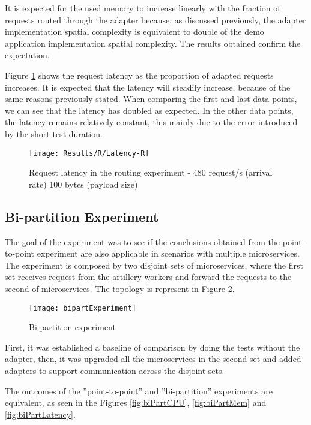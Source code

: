 It is expected for the used memory to increase linearly with the fraction of requests routed through the adapter because, as discussed previously,
the adapter implementation spatial complexity is equivalent to double of the demo application implementation spatial complexity.
The results obtained confirm the expectation.

Figure \ref{fig:routLatency} shows the request latency as the proportion of adapted requests increases.
It is expected that the latency will steadily increase, because of the same reasons previously stated.
When comparing the first and last data points, we can see that the latency has doubled as expected.
In the other data points, the latency remains relatively constant, this mainly due to the error introduced by the short test duration.

\begin{figure}[htbp]
    \centering
    \centerline{\texttt{[image: Results/R/Latency-R]}}
    \caption{Request latency in the routing experiment - 480 request/s (arrival rate) 100 bytes (payload size)}
    \label{fig:routLatency}
\end{figure}

\subsection{Bi-partition Experiment}

The goal of the experiment was to see if the conclusions obtained from the point-to-point experiment are also applicable in scenarios with multiple microservices.
The experiment is composed by two disjoint sets of microservices, where the first set receives request from the artillery workers and forward the requests to the second of microservices.
The topology is represent in Figure \ref{fig:biPart}.

\begin{figure}[htbp]
    \centering
    \centerline{\texttt{[image: bipartExperiment]}}
    \caption{Bi-partition experiment}
    \label{fig:biPart}
\end{figure}

First, it was established a baseline of comparison by doing the tests without the adapter,
then, it was upgraded all the microservices in the second set and added adapters to support communication across the disjoint sets.

The outcomes of the ''point-to-point'' and ''bi-partition'' experiments are equivalent, as seen in the Figures \ref{fig:biPartCPU}, \ref{fig:biPartMem} and \ref{fig:biPartLatency}.

